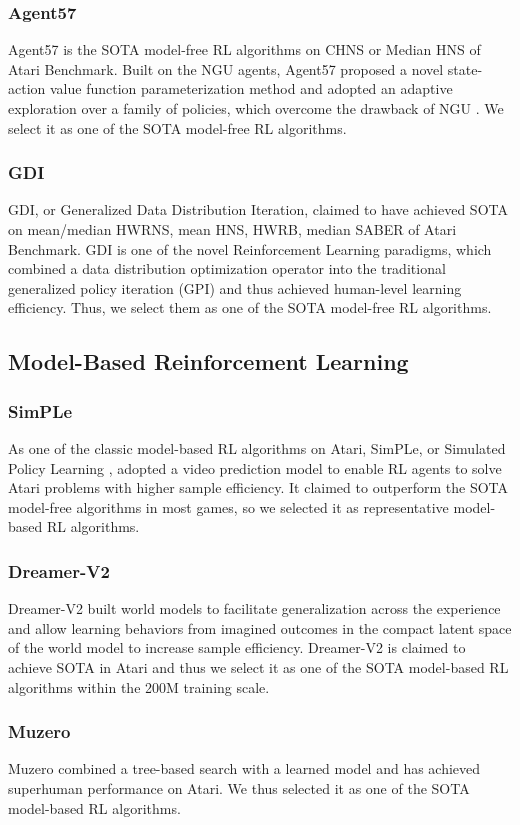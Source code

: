 \documentclass[nohyperref]{article}
\theoremstyle{plain}
\begin{document}
\subsubsection{Agent57}
Agent57 \citep{agent57} is the SOTA model-free RL algorithms on CHNS or Median HNS of Atari Benchmark. Built on the NGU agents, Agent57 proposed a novel state-action value function parameterization method and adopted an adaptive exploration over a family of policies, which overcome the drawback of NGU \citep{agent57}. We select it as one of the SOTA model-free RL algorithms.

\subsubsection{GDI}
GDI, or Generalized Data Distribution Iteration, claimed to have achieved  SOTA on mean/median HWRNS, mean HNS, HWRB, median SABER of Atari Benchmark. GDI is one of the novel Reinforcement Learning paradigms, which combined a data distribution optimization operator into the traditional generalized policy iteration (GPI) \citep{sutton} and thus achieved human-level learning efficiency.  Thus, we select them as one of the SOTA model-free RL algorithms.


\subsection{Model-Based Reinforcement Learning}
\subsubsection{SimPLe}
As one of the classic model-based RL algorithms on Atari, SimPLe, or Simulated Policy Learning \citep{modelbasedatari}, adopted a video prediction model to enable RL agents to solve Atari problems with higher sample efficiency. It claimed to outperform the SOTA model-free algorithms in most games, so we selected it as representative model-based RL algorithms.
\subsubsection{Dreamer-V2}
Dreamer-V2 \citep{dreamerv2} built world models to facilitate generalization across the experience and allow learning behaviors from imagined outcomes in the compact latent space of the world model to increase sample efficiency. Dreamer-V2 is claimed to achieve SOTA in Atari and thus  we select it as one of the SOTA model-based RL algorithms within the 200M training scale.
\subsubsection{Muzero}
Muzero \citep{muzero} combined a tree-based search with a learned model and has achieved superhuman performance on Atari. We thus selected it as one of the SOTA model-based RL algorithms.
\end{document}

